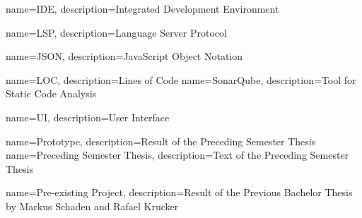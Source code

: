 {
	name=IDE,
	description={Integrated Development Environment}
}

{
	name=LSP,
	description={Language Server Protocol}
}

{
	name=JSON,
	description={JavaScript Object Notation}
}

{
	name=LOC,
	description={Lines of Code}
}
{
	name=SonarQube,
	description={Tool for Static Code Analysis}
}




{
	name=UI,
	description={User Interface}
}

{
	name=Prototype,
	description={Result of the Preceding Semester Thesis}
}
{
	name=Preceding Semester Thesis,
	description={Text of the Preceding Semester Thesis}
}

{
	name=Pre-existing Project,
	description={Result of the Previous Bachelor Thesis by Markus Schaden and Rafael Krucker}
}




